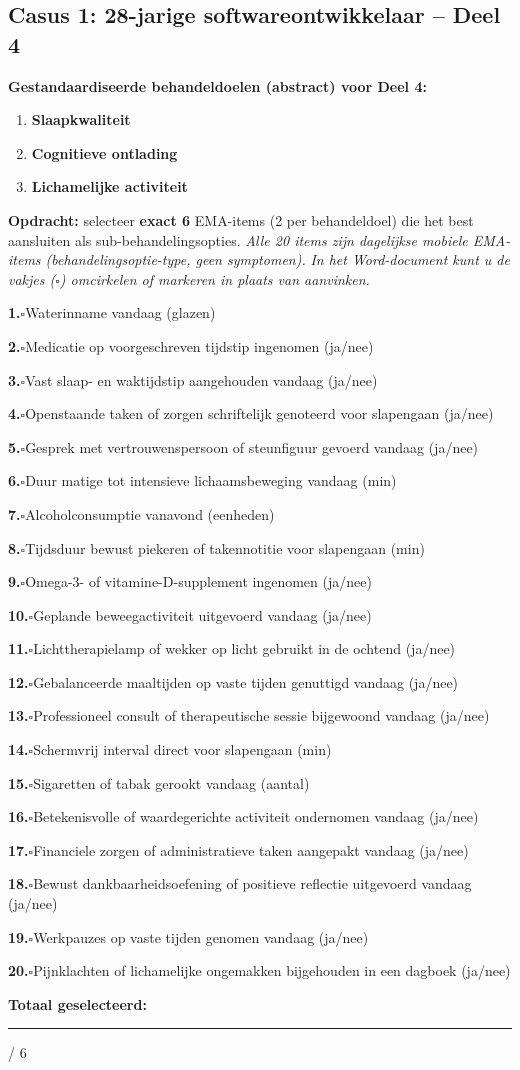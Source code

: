 \documentclass[11pt,a4paper]{article}
\newcommand{\checkitemBFS}[2]{%
\noindent\small\textbf{#1.}\hspace{0.45em}$\square$\hspace{0.4em}#2\par\vspace{0.20em}}
\begin{document}
\newpage
\subsection*{Casus 1: 28-jarige softwareontwikkelaar -- Deel 4}

\begin{contextbox}
\small\textbf{Gestandaardiseerde behandeldoelen (abstract) voor Deel 4:}
\begin{enumerate}[topsep=2pt,itemsep=1pt,label=\arabic*.]
\item \textbf{Slaapkwaliteit}
\item \textbf{Cognitieve ontlading}
\item \textbf{Lichamelijke activiteit}
\end{enumerate}
\end{contextbox}

\begin{responsebox}
\small\textbf{Opdracht:} selecteer \textbf{exact 6} EMA-items (2 per behandeldoel) die het best aansluiten als sub-behandelingsopties.
\textit{Alle 20 items zijn dagelijkse mobiele EMA-items (behandelingsoptie-type, geen symptomen).}
\textit{In het Word-document kunt u de vakjes ($\square$) omcirkelen of markeren in plaats van aanvinken.}

\checkitemBFS{1}{Waterinname vandaag (glazen)}
\checkitemBFS{2}{Medicatie op voorgeschreven tijdstip ingenomen (ja/nee)}
\checkitemBFS{3}{Vast slaap- en waktijdstip aangehouden vandaag (ja/nee)}
\checkitemBFS{4}{Openstaande taken of zorgen schriftelijk genoteerd voor slapengaan (ja/nee)}
\checkitemBFS{5}{Gesprek met vertrouwenspersoon of steunfiguur gevoerd vandaag (ja/nee)}
\checkitemBFS{6}{Duur matige tot intensieve lichaamsbeweging vandaag (min)}
\checkitemBFS{7}{Alcoholconsumptie vanavond (eenheden)}
\checkitemBFS{8}{Tijdsduur bewust piekeren of takennotitie voor slapengaan (min)}
\checkitemBFS{9}{Omega-3- of vitamine-D-supplement ingenomen (ja/nee)}
\checkitemBFS{10}{Geplande beweegactiviteit uitgevoerd vandaag (ja/nee)}
\checkitemBFS{11}{Lichttherapielamp of wekker op licht gebruikt in de ochtend (ja/nee)}
\checkitemBFS{12}{Gebalanceerde maaltijden op vaste tijden genuttigd vandaag (ja/nee)}
\checkitemBFS{13}{Professioneel consult of therapeutische sessie bijgewoond vandaag (ja/nee)}
\checkitemBFS{14}{Schermvrij interval direct voor slapengaan (min)}
\checkitemBFS{15}{Sigaretten of tabak gerookt vandaag (aantal)}
\checkitemBFS{16}{Betekenisvolle of waardegerichte activiteit ondernomen vandaag (ja/nee)}
\checkitemBFS{17}{Financiele zorgen of administratieve taken aangepakt vandaag (ja/nee)}
\checkitemBFS{18}{Bewust dankbaarheidsoefening of positieve reflectie uitgevoerd vandaag (ja/nee)}
\checkitemBFS{19}{Werkpauzes op vaste tijden genomen vandaag (ja/nee)}
\checkitemBFS{20}{Pijnklachten of lichamelijke ongemakken bijgehouden in een dagboek (ja/nee)}
\vspace{0.4em}
\noindent\textbf{Totaal geselecteerd:}\hspace{0.5em}\rule{1.2cm}{0.25pt}\hspace{0.2em}/ 6
\end{responsebox}
\end{document}
